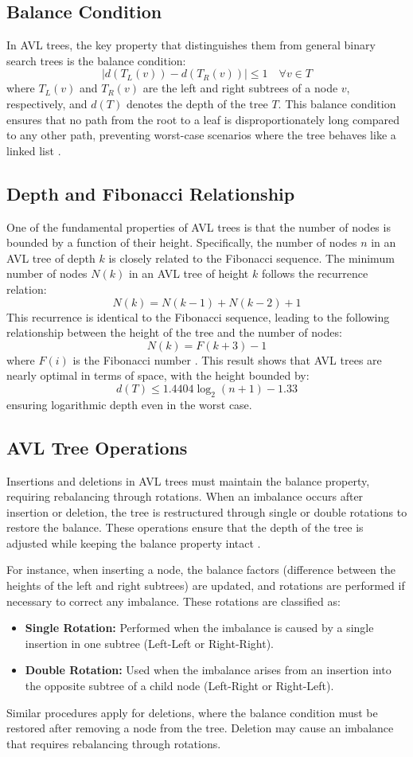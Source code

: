 \documentclass[12pt]{article}
\begin{document}
\subsection{Balance Condition}
In AVL trees, the key property that distinguishes them from general binary search trees is the balance condition:
\[
|d(T_L(v)) - d(T_R(v))| \leq 1 \quad \forall v \in T
\]
where $T_L(v)$ and $T_R(v)$ are the left and right subtrees of a node $v$, respectively, and $d(T)$ denotes the depth of the tree $T$. This balance condition ensures that no path from the root to a leaf is disproportionately long compared to any other path, preventing worst-case scenarios where the tree behaves like a linked list \cite{knuth1998art}.

\subsection{Depth and Fibonacci Relationship}
One of the fundamental properties of AVL trees is that the number of nodes is bounded by a function of their height. Specifically, the number of nodes $n$ in an AVL tree of depth $k$ is closely related to the Fibonacci sequence. The minimum number of nodes $N(k)$ in an AVL tree of height $k$ follows the recurrence relation:
\[
N(k) = N(k-1) + N(k-2) + 1
\]
This recurrence is identical to the Fibonacci sequence, leading to the following relationship between the height of the tree and the number of nodes:
\[
N(k) = F(k+3) - 1
\]
where $F(i)$ is the Fibonacci number \cite{harrison2009handbook}. This result shows that AVL trees are nearly optimal in terms of space, with the height bounded by:
\[
d(T) \leq 1.4404 \log_2(n + 1) - 1.33
\]
ensuring logarithmic depth even in the worst case.


\subsection{AVL Tree Operations}
Insertions and deletions in AVL trees must maintain the balance property, requiring rebalancing through rotations. When an imbalance occurs after insertion or deletion, the tree is restructured through single or double rotations to restore the balance. These operations ensure that the depth of the tree is adjusted while keeping the balance property intact \cite{harrison2009handbook}.

For instance, when inserting a node, the balance factors (difference between the heights of the left and right subtrees) are updated, and rotations are performed if necessary to correct any imbalance. These rotations are classified as:
\begin{itemize}
    \item \textbf{Single Rotation:} Performed when the imbalance is caused by a single insertion in one subtree (Left-Left or Right-Right).
    \item \textbf{Double Rotation:} Used when the imbalance arises from an insertion into the opposite subtree of a child node (Left-Right or Right-Left).
\end{itemize}
Similar procedures apply for deletions, where the balance condition must be restored after removing a node from the tree. Deletion may cause an imbalance that requires rebalancing through rotations.
\end{document}
